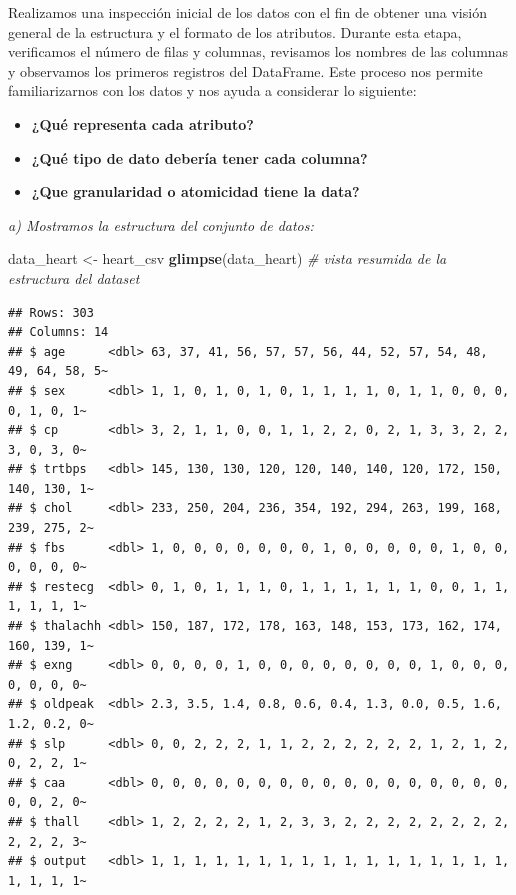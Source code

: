 \documentclass[
]{article}
\newenvironment{Shaded}{\begin{snugshade}}{\end{snugshade}}
\newcommand{\CommentTok}[1]{\textcolor[rgb]{0.56,0.35,0.01}{\textit{#1}}}
\newcommand{\FunctionTok}[1]{\textcolor[rgb]{0.13,0.29,0.53}{\textbf{#1}}}
\newcommand{\NormalTok}[1]{#1}
\newcommand{\OtherTok}[1]{\textcolor[rgb]{0.56,0.35,0.01}{#1}}
\providecommand{\tightlist}{%
  \setlength{\itemsep}{0pt}\setlength{\parskip}{0pt}}
\begin{document}
Realizamos una inspección inicial de los datos con el fin de obtener una
visión general de la estructura y el formato de los atributos. Durante
esta etapa, verificamos el número de filas y columnas, revisamos los
nombres de las columnas y observamos los primeros registros del
DataFrame. Este proceso nos permite familiarizarnos con los datos y nos
ayuda a considerar lo siguiente:

\begin{itemize}
\tightlist
\item
  \textbf{¿Qué representa cada atributo?}
\item
  \textbf{¿Qué tipo de dato debería tener cada columna?}
\item
  \textbf{¿Que granularidad o atomicidad tiene la data?}
\end{itemize}

\emph{a) Mostramos la estructura del conjunto de datos:}

\begin{Shaded}
\begin{Highlighting}[]
\NormalTok{data\_heart }\OtherTok{\textless{}{-}}\NormalTok{ heart\_csv}
\FunctionTok{glimpse}\NormalTok{(data\_heart) }\CommentTok{\# vista resumida de la estructura del dataset}
\end{Highlighting}
\end{Shaded}

\begin{verbatim}
## Rows: 303
## Columns: 14
## $ age      <dbl> 63, 37, 41, 56, 57, 57, 56, 44, 52, 57, 54, 48, 49, 64, 58, 5~
## $ sex      <dbl> 1, 1, 0, 1, 0, 1, 0, 1, 1, 1, 1, 0, 1, 1, 0, 0, 0, 0, 1, 0, 1~
## $ cp       <dbl> 3, 2, 1, 1, 0, 0, 1, 1, 2, 2, 0, 2, 1, 3, 3, 2, 2, 3, 0, 3, 0~
## $ trtbps   <dbl> 145, 130, 130, 120, 120, 140, 140, 120, 172, 150, 140, 130, 1~
## $ chol     <dbl> 233, 250, 204, 236, 354, 192, 294, 263, 199, 168, 239, 275, 2~
## $ fbs      <dbl> 1, 0, 0, 0, 0, 0, 0, 0, 1, 0, 0, 0, 0, 0, 1, 0, 0, 0, 0, 0, 0~
## $ restecg  <dbl> 0, 1, 0, 1, 1, 1, 0, 1, 1, 1, 1, 1, 1, 0, 0, 1, 1, 1, 1, 1, 1~
## $ thalachh <dbl> 150, 187, 172, 178, 163, 148, 153, 173, 162, 174, 160, 139, 1~
## $ exng     <dbl> 0, 0, 0, 0, 1, 0, 0, 0, 0, 0, 0, 0, 0, 1, 0, 0, 0, 0, 0, 0, 0~
## $ oldpeak  <dbl> 2.3, 3.5, 1.4, 0.8, 0.6, 0.4, 1.3, 0.0, 0.5, 1.6, 1.2, 0.2, 0~
## $ slp      <dbl> 0, 0, 2, 2, 2, 1, 1, 2, 2, 2, 2, 2, 2, 1, 2, 1, 2, 0, 2, 2, 1~
## $ caa      <dbl> 0, 0, 0, 0, 0, 0, 0, 0, 0, 0, 0, 0, 0, 0, 0, 0, 0, 0, 0, 2, 0~
## $ thall    <dbl> 1, 2, 2, 2, 2, 1, 2, 3, 3, 2, 2, 2, 2, 2, 2, 2, 2, 2, 2, 2, 3~
## $ output   <dbl> 1, 1, 1, 1, 1, 1, 1, 1, 1, 1, 1, 1, 1, 1, 1, 1, 1, 1, 1, 1, 1~
\end{verbatim}
\end{document}
